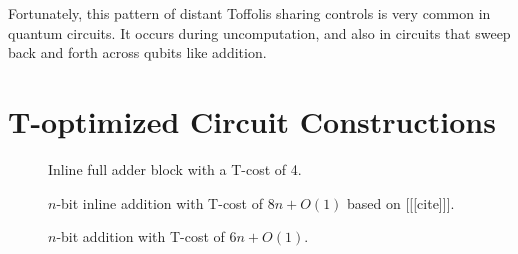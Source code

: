 \documentclass[twocolumn,longbibliography]{quantumarticle-customized}
\begin{document}
Fortunately, this pattern of distant Toffolis sharing controls is very common in quantum circuits.
It occurs during uncomputation, and also in circuits that sweep back and forth across qubits like addition.


\section{T-optimized Circuit Constructions}
\label{sec:circuit-constructions}


\begin{figure}
  \caption{
	Inline full adder block with a T-cost of 4.
  }
  \label{fig:addition}
\end{figure}





\begin{figure}
  \centering
  \makebox[\linewidth]{
  }
  \caption{
	$n$-bit inline addition with T-cost of $8n + O(1)$ based on [[[cite]]].
  }
  \label{fig:inline-addition}
\end{figure}


\begin{figure}
  \centering
  \makebox[\linewidth]{
  }
  \caption{
	$n$-bit addition with T-cost of $6n + O(1)$.
  }
  \label{fig:ancilla-addition}
\end{figure}
\end{document}
